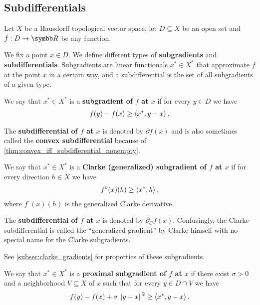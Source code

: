 \subsection{Subdifferentials}\label{subsec:subdifferentials}

Let \( X \) be a Hausdorff topological vector space, let \( D \subseteq X \) be an open set and \( f: D \to \BB{R} \) be any function.

\begin{definition}\label{def:subdifferentials}
  We fix a point \( x \in D \). We define different types of \textbf{subgradients} and \textbf{subdifferentials}. Subgradients are linear functionals \( x^* \in X^* \) that approximate \( f \) at the point \( x \) in a certain way, and a subdifferential is the set of all subgradients of a given type.

  \begin{defenum}
    \cite[59]{Clarke2013} We say that \( x^* \in X^* \) is a \textbf{subgradient of \( f \) at \( x \)} if for every \( y \in D \) we have
    \begin{align*}
      f(y) - f(x) \geq \left\langle x^*, y - x \right\rangle.
    \end{align*}

    The \textbf{subdifferential of \( f \) at \( x \)} is denoted by \( \partial f(x) \) and is also sometimes called the \textbf{convex subdifferential} because of \cref{thm:convex_iff_subdifferential_nonempty}.

    \cite[definition 10.3]{Clarke2013} We say that \( x^* \in X^* \) is a \textbf{Clarke (generalized) subgradient of \( f \) at \( x \)} if for every direction \( h \in X \) we have
    \begin{align*}
      f^\circ(x)(h) \geq \left\langle x^*, h \right\rangle,
    \end{align*}
    where \( f^\circ(x)(h) \) is the generalized Clarke derivative.

    The \textbf{subdifferential of \( f \) at \( x \)} is denoted by \( \partial_C f(x) \). Confusingly, the Clarke subdifferential is called the \enquote{generalized gradient} by Clarke himself with no special name for the Clarke subgradients.

    See \cref{subsec:clarke_gradients} for properties of these subgradients.

    \cite[227]{Clarke2013} We say that \( x^* \in X^* \) is a \textbf{proximal subgradient of \( f \) at \( x \)} if there exist \( \sigma > 0 \) and a neighborhood \( V \subseteq X \) of \( x \) such that for every \( y \in D \cap V \) we have
    \begin{align*}
      f(y) - f(x) + \sigma \left\Vert y - x \right\Vert^2 \geq \left\langle x^*, y - x \right\rangle.
    \end{align*}


\end{defenum}
\end{definition}
